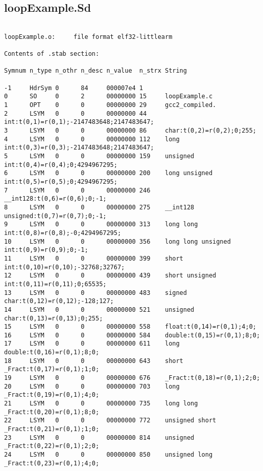 \subsection{loopExample.Sd}
\label{anhang:loopExample.Sd}
\lstset{language=plain}
\begin{lstlisting}

loopExample.o:     file format elf32-littlearm

Contents of .stab section:

Symnum n_type n_othr n_desc n_value  n_strx String

-1     HdrSym 0      84     000007e4 1     
0      SO     0      2      00000000 15     loopExample.c
1      OPT    0      0      00000000 29     gcc2_compiled.
2      LSYM   0      0      00000000 44     int:t(0,1)=r(0,1);-2147483648;2147483647;
3      LSYM   0      0      00000000 86     char:t(0,2)=r(0,2);0;255;
4      LSYM   0      0      00000000 112    long int:t(0,3)=r(0,3);-2147483648;2147483647;
5      LSYM   0      0      00000000 159    unsigned int:t(0,4)=r(0,4);0;4294967295;
6      LSYM   0      0      00000000 200    long unsigned int:t(0,5)=r(0,5);0;4294967295;
7      LSYM   0      0      00000000 246    __int128:t(0,6)=r(0,6);0;-1;
8      LSYM   0      0      00000000 275    __int128 unsigned:t(0,7)=r(0,7);0;-1;
9      LSYM   0      0      00000000 313    long long int:t(0,8)=r(0,8);-0;4294967295;
10     LSYM   0      0      00000000 356    long long unsigned int:t(0,9)=r(0,9);0;-1;
11     LSYM   0      0      00000000 399    short int:t(0,10)=r(0,10);-32768;32767;
12     LSYM   0      0      00000000 439    short unsigned int:t(0,11)=r(0,11);0;65535;
13     LSYM   0      0      00000000 483    signed char:t(0,12)=r(0,12);-128;127;
14     LSYM   0      0      00000000 521    unsigned char:t(0,13)=r(0,13);0;255;
15     LSYM   0      0      00000000 558    float:t(0,14)=r(0,1);4;0;
16     LSYM   0      0      00000000 584    double:t(0,15)=r(0,1);8;0;
17     LSYM   0      0      00000000 611    long double:t(0,16)=r(0,1);8;0;
18     LSYM   0      0      00000000 643    short _Fract:t(0,17)=r(0,1);1;0;
19     LSYM   0      0      00000000 676    _Fract:t(0,18)=r(0,1);2;0;
20     LSYM   0      0      00000000 703    long _Fract:t(0,19)=r(0,1);4;0;
21     LSYM   0      0      00000000 735    long long _Fract:t(0,20)=r(0,1);8;0;
22     LSYM   0      0      00000000 772    unsigned short _Fract:t(0,21)=r(0,1);1;0;
23     LSYM   0      0      00000000 814    unsigned _Fract:t(0,22)=r(0,1);2;0;
24     LSYM   0      0      00000000 850    unsigned long _Fract:t(0,23)=r(0,1);4;0;

\end{lstlisting}
